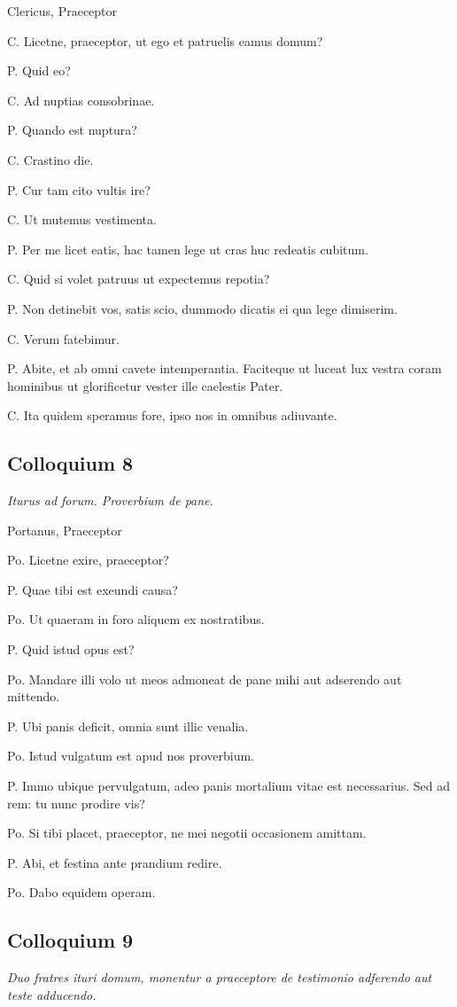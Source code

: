 \documentclass{article}
\begin{document}
Clericus, Praeceptor

C. Licetne, praeceptor, ut ego et patruelis eamus domum?

P. Quid eo?

C. Ad nuptias consobrinae.

P. Quando est nuptura?

C. Crastino die.

P. Cur tam cito vultis ire?

C. Ut mutemus vestimenta.

P. Per me licet eatis, hac tamen lege ut cras huc redeatis cubitum.

C. Quid si volet patruus ut expectemus repotia?

P. Non detinebit vos, satis scio, dummodo dicatis ei qua lege dimiserim.

C. Verum fatebimur.

P. Abite, et ab omni cavete intemperantia. Faciteque ut luceat lux vestra coram hominibus ut glorificetur vester ille caelestis Pater.

C. Ita quidem speramus fore, ipso nos in omnibus adiuvante.

\subsection{Colloquium 8}
\emph{Iturus ad forum. Proverbium de pane.}

Portanus, Praeceptor

Po. Licetne exire, praeceptor?

P. Quae tibi est exeundi causa?

Po. Ut quaeram in foro aliquem ex nostratibus.

P. Quid istud opus est?

Po. Mandare illi volo ut meos admoneat de pane mihi aut adserendo aut mittendo.

P. Ubi panis deficit, omnia sunt illic venalia.

Po. Istud vulgatum est apud nos proverbium.

P. Immo ubique pervulgatum, adeo panis mortalium vitae est necessarius. Sed ad rem: tu nunc prodire vis?

Po. Si tibi placet, praeceptor, ne mei negotii occasionem amittam.

P. Abi, et festina ante prandium redire.

Po. Dabo equidem operam.

\subsection{Colloquium 9}
\emph{Duo fratres ituri domum, monentur a praeceptore de testimonio adferendo aut teste adducendo.}
\end{document}
